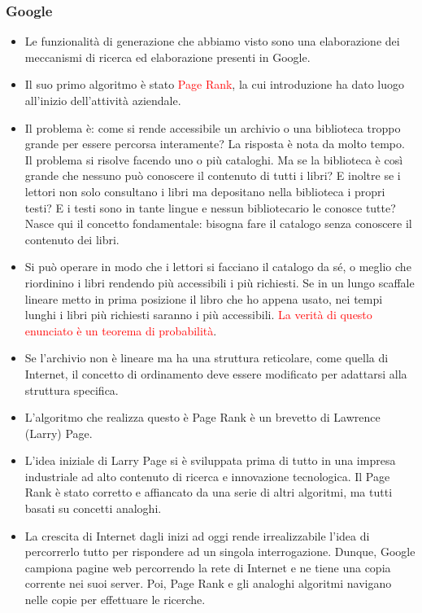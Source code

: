 \documentclass[xcolor=svgnames]{beamer}
\newcommand{\rosso}[1]{\textcolor{red}{#1}}
\renewcommand{\emph}{\rosso}
\begin{document}
\begin{frame}\small\frametitle{Google}

  \begin{itemize}
  \item
    Le funzionalità di generazione che abbiamo visto sono una elaborazione dei meccanismi di ricerca ed elaborazione presenti in Google.
 \item    
  Il suo primo algoritmo è stato \emph{Page Rank}, la cui introduzione ha dato luogo all'inizio dell'attività aziendale.
\item 
Il problema è: come si rende accessibile un archivio o una biblioteca troppo grande per essere percorsa interamente? La risposta è nota da molto tempo. Il problema si risolve facendo uno o più cataloghi. Ma se la biblioteca è così grande che nessuno può conoscere il contenuto di tutti i libri? E inoltre se i lettori non solo consultano i libri ma depositano nella biblioteca i propri testi? E i testi sono in tante lingue e nessun bibliotecario le conosce tutte? Nasce qui il concetto fondamentale: bisogna fare il catalogo senza conoscere il contenuto dei libri.
\item 
Si può operare in modo che i lettori si facciano il catalogo da sé, o meglio che riordinino i libri rendendo più accessibili i più richiesti. Se in un lungo scaffale lineare metto in prima posizione il libro che ho appena usato, nei tempi lunghi i libri più richiesti saranno i più accessibili. \emph{La verità di questo enunciato è un teorema di probabilità}.
\item
Se l'archivio non è lineare ma ha una struttura reticolare, come quella di Internet, il concetto di ordinamento deve essere modificato per adattarsi alla struttura specifica.
\item 
L'algoritmo che realizza questo è Page Rank è un brevetto di Lawrence (Larry) Page.
\item
L'idea iniziale di Larry Page si è sviluppata prima di tutto in una impresa industriale ad alto contenuto di ricerca e innovazione tecnologica. Il Page Rank è stato corretto e affiancato da una serie di altri algoritmi, ma tutti basati su concetti analoghi.
\item
  La crescita di Internet dagli inizi ad oggi rende irrealizzabile l'idea di percorrerlo tutto per rispondere ad un singola interrogazione. Dunque, Google campiona pagine web percorrendo la rete di Internet e ne tiene una copia corrente nei suoi server. Poi, Page Rank e gli analoghi algoritmi navigano nelle copie per effettuare le ricerche.

\end{itemize}
\end{frame}
\end{document}

